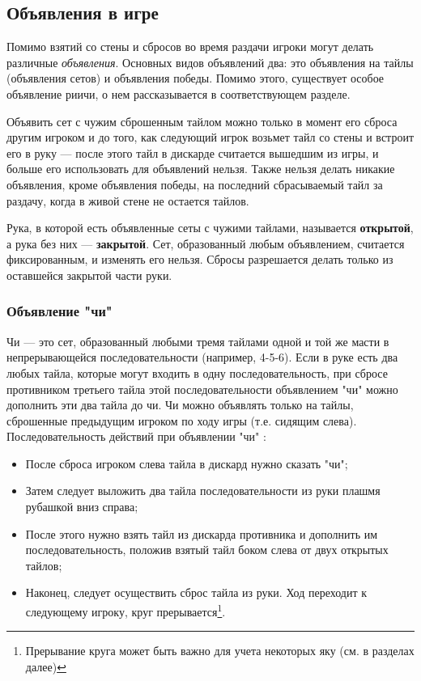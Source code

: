 \subsection{Объявления в игре}

Помимо взятий со стены и сбросов во время раздачи игроки могут делать различные \textit{объявления}. Основных видов объявлений два: это объявления на тайлы (объявления сетов) и объявления победы. Помимо этого, существует особое объявление риичи, о нем рассказывается в соответствующем разделе.

 Объявить сет с чужим сброшенным тайлом можно только в момент его сброса другим игроком и до того, как следующий игрок возьмет тайл со стены и встроит его в руку --- после этого тайл в дискарде считается вышедшим из игры, и больше его использовать для объявлений нельзя. Также нельзя делать никакие объявления, кроме объявления победы, на последний сбрасываемый тайл за раздачу, когда в живой стене не остается тайлов.

Рука, в которой есть объявленные сеты с чужими тайлами, называется \textbf{открытой}, а рука без них --- \textbf{закрытой}. Сет, образованный любым объявлением, считается фиксированным, и изменять его нельзя. Сбросы разрешается делать только из оставшейся закрытой части руки.

\subsubsection{Объявление "чи"}

Чи --- это сет, образованный любыми тремя тайлами одной и той же масти в непрерывающейся последовательности (например, 4-5-6). Если в руке есть два любых тайла, которые могут входить в одну последовательность, при сбросе противником третьего тайла этой последовательности объявлением "чи" можно дополнить эти два тайла до чи. Чи можно объявлять только на тайлы, сброшенные предыдущим игроком по ходу игры (т.е. сидящим слева). Последовательность действий при объявлении "чи" :

\begin{itemize}
	\item После сброса игроком слева тайла в дискард нужно сказать "чи";
	\item Затем следует выложить два тайла последовательности из руки плашмя рубашкой вниз справа;
	\item После этого нужно взять тайл из дискарда противника и дополнить им последовательность, положив взятый тайл боком слева от двух открытых тайлов;
	\item Наконец, следует осуществить сброс тайла из руки. Ход переходит к следующему игроку, круг прерывается\footnote{Прерывание круга может быть важно для учета некоторых яку (см. в разделах далее)}.
\end{itemize}

